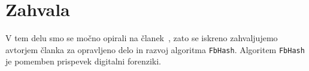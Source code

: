 \documentclass{acm_proc_article-sp}
\begin{document}
\section{Zahvala}
V tem delu smo se močno opirali na članek~\cite{fbhash}, zato se iskreno zahvaljujemo avtorjem članka za opravljeno delo in razvoj algoritma \texttt{FbHash}. Algoritem \texttt{FbHash} je pomemben prispevek digitalni forenziki.




\balancecolumns
\end{document}
